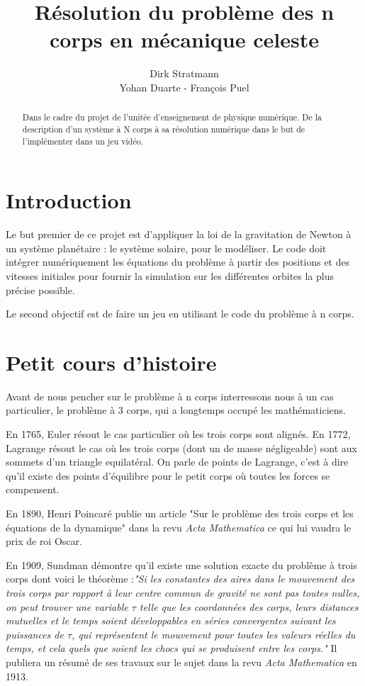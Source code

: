\documentclass[a4paper]{article}
\title{Résolution du problème des n corps en mécanique celeste}
\author{Dirk Stratmann \\ Yohan Duarte - François Puel}
\begin{document}
\maketitle
\begin{abstract}
Dans le cadre du projet de l'unitée d'enseignement de physique numérique.
De la description d'un système à N corps à sa résolution numérique dans le but de l'implémenter dans un jeu vidéo.
\end{abstract}


\newpage
\tableofcontents

\newpage
\section{Introduction}
\label{sec:Introduction}

Le but premier de ce projet est d'appliquer la loi de la gravitation de Newton à un système planétaire : le système solaire, pour le modéliser. Le code doit intégrer numériquement les équations du problème à partir des positions et des vitesses initiales pour fournir la simulation sur les différentes orbites la plus précise possible.

Le second objectif est de faire un jeu en utilisant le code du problème à n corps.

\section{Petit cours d'histoire}
Avant de nous pencher sur le problème à n corps interressons nous à un cas particulier, le problème à 3 corps, qui a longtemps occupé les mathématiciens.

En 1765, Euler résout le cas particulier où les trois corps sont alignés. En 1772, Lagrange résout le cas où les trois corps (dont un de masse négligeable) sont aux sommets d'un triangle equilatéral. On parle de points de Lagrange, c'est à dire qu'il existe des points d'équilibre pour le petit corps où toutes les forces se compensent.

En 1890, Henri Poincaré publie un article "Sur le problème des trois corps et les équations de la dynamique" dans la revu \textit{Acta Mathematica} ce qui lui vaudra le prix de roi Oscar.

En 1909, Sundman démontre qu'il existe une solution exacte du problème à trois corps dont voici le théorème :\textit{"Si les constantes des aires dans le mouvement des trois corps par rapport à leur centre commun de gravité ne sont pas toutes nulles, on peut trouver une variable $\tau$ telle que les coordonnées des corps, leurs distances mutuelles et le temps soient développables en séries convergentes suivant les puissances de $\tau$, qui représentent le mouvement pour toutes les valeurs réelles du temps, et cela quels que soient les chocs qui se produisent entre les corps."}
Il publiera un résumé de ses travaux sur le sujet dans la revu \textit{Acta Mathematica} en 1913.
\end{document}
